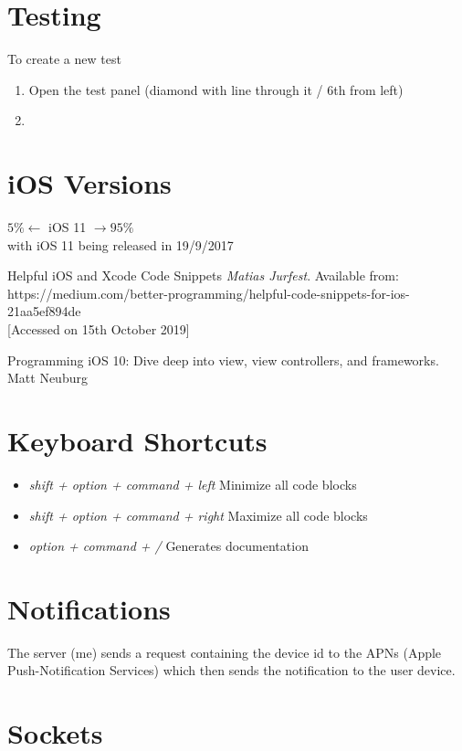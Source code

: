 \documentclass[]{article}
\newcommand{\<}{\guilsinglleft}
\renewcommand{\>}{\guilsinglright}
\renewcommand{\it}[1]{\textit{#1}}
\begin{document}
\section{Testing}
To create a new test
\begin{enumerate}
	\item Open the test panel (diamond with line through it / 6th from left)
	\item 
\end{enumerate}


\section{iOS Versions}
$5\% \leftarrow$  iOS 11 $\rightarrow 95\%$
\\
with iOS 11 being released in 19/9/2017

\begin{thebibliography}{99}
	
	Helpful iOS and Xcode Code Snippets
	\it{Matias Jurfest}.
	Available from:
	\<https://medium.com/better-programming/helpful-code-snippets-for-ios-21aa5ef894de\>
	\\{[Accessed on 15th October 2019]}
	
	Programming iOS 10: Dive deep into view, view controllers, and frameworks.
	Matt Neuburg

\end{thebibliography}

\section{Keyboard Shortcuts}
\begin{itemize}
	\item \it{shift + option + command + left}
	\subitem Minimize all code blocks
	
	\item \it{shift + option + command + right}
	\subitem Maximize all code blocks
	
	\item \it{option + command + /}
	\subitem Generates documentation 
\end{itemize}

\section{Notifications}
The server (me) sends a request containing the device id to the APNs (Apple Push-Notification Services) which then sends the notification to the user device.


\section{Sockets}
\end{document}
